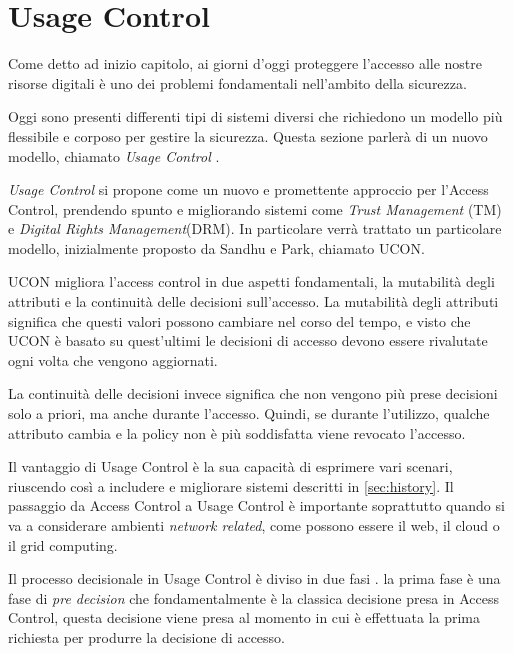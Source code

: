 \section{Usage Control} %
\label{sec:usage_control}
Come detto ad inizio capitolo, ai giorni d'oggi proteggere l'accesso alle nostre risorse digitali è uno dei problemi fondamentali nell'ambito della sicurezza. \\ \par
Oggi sono presenti differenti tipi di sistemi diversi che richiedono un modello più flessibile e corposo per gestire la sicurezza. Questa sezione parlerà di un nuovo modello, chiamato \textit{Usage Control} \cite{SurveyUsageControl}.\\ \par
\textit{Usage Control} si propone come un nuovo e promettente approccio per l'Access Control, prendendo spunto e migliorando sistemi come \textit{Trust Management} (TM) e \textit{Digital Rights Management}(DRM). In particolare verrà trattato un particolare modello, inizialmente proposto da Sandhu e Park\cite{SurveyUsageControl}, chiamato UCON.\\ \par
UCON migliora l'access control in due aspetti fondamentali, la mutabilità degli attributi e la continuità delle decisioni sull'accesso. La mutabilità degli attributi significa che questi valori possono cambiare nel corso del tempo, e visto che UCON è basato su quest'ultimi le decisioni di accesso devono essere rivalutate ogni volta che vengono aggiornati.\\ \par
La continuità delle decisioni invece significa che non vengono più prese decisioni solo a priori, ma anche durante l'accesso. Quindi, se durante l'utilizzo, qualche attributo cambia e la policy non è più soddisfatta viene revocato l'accesso.\\ \par
Il vantaggio di Usage Control è la sua capacità di esprimere vari scenari, riuscendo così a includere e migliorare sistemi descritti in \ref{sec:history}.
Il passaggio da Access Control a Usage Control è importante soprattutto quando si va a considerare ambienti \textit{network related}, come possono essere il web, il cloud o il grid computing.\\ \par
Il processo decisionale in Usage Control è diviso in due fasi \cite{UsageControlCloud}. la prima fase è una fase di \textit{pre decision} che fondamentalmente è la classica decisione presa in Access Control, questa decisione viene presa al momento in cui è effettuata la prima richiesta per produrre la decisione di accesso.

